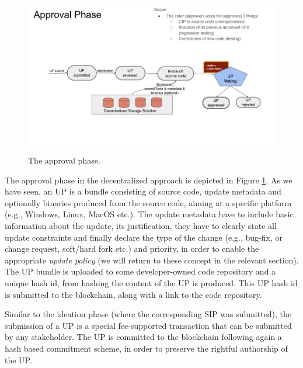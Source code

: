 \begin{figure}[H]
    \caption{The approval phase.}
    \centering
    \includegraphics[width=0.9 \columnwidth,keepaspectratio]{figures/approval_phase.pdf}
    \label{approval}
\end{figure}

The approval phase in the decentralized approach is depicted in Figure \ref{approval}. As we have seen, an UP is a bundle consisting of source code, update metadata and optionally binaries produced from the source code, aiming at a specific platform (e.g., Windows, Linux, MacOS etc.). The update metadata have to include basic information about the update, its justification, they have to clearly state all update constraints and finally declare the type of the change (e.g., bug-fix, or change request, soft/hard fork etc.) and priority, in order to enable the appropriate \emph{update policy} (we will return to these concept in the relevant section). The UP bundle is uploaded to some developer-owned code repository and a unique hash id, from hashing the content of the UP is produced. This UP hash id is submitted to the blockchain, along with a link to the code repository.

Similar to the ideation phase (where the corresponding SIP was submitted), the submission of a UP is a special fee-supported transaction that can be submitted by any stakeholder. The UP is committed to the blockchain following again a hash based commitment scheme, in order to preserve the rightful authorship of the UP.

